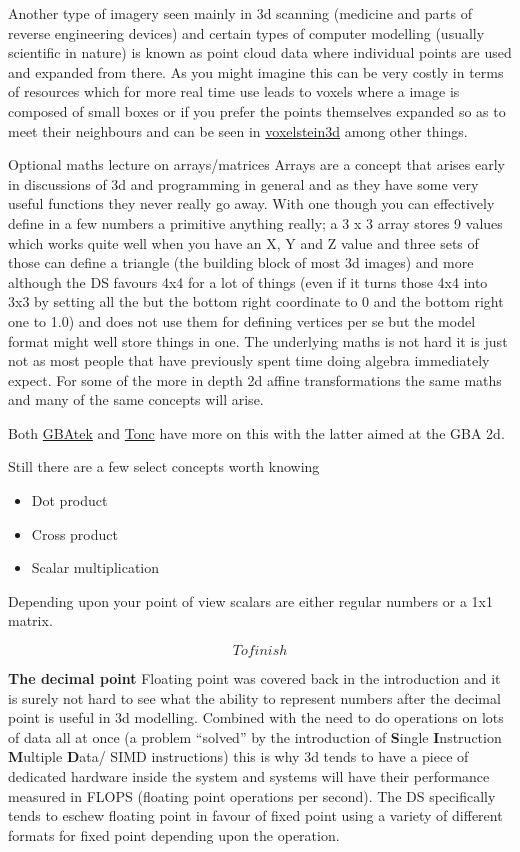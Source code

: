 \documentclass[
]{book}
\providecommand{\tightlist}{%
  \setlength{\itemsep}{0pt}\setlength{\parskip}{0pt}}
\begin{document}
Another type of imagery seen mainly in 3d scanning (medicine and parts of reverse engineering devices) and certain types of computer modelling (usually scientific in nature) is known as point cloud data where individual points are used and expanded from there. As you might imagine this can be very costly in terms of resources which for more real time use leads to voxels where a image is composed of small boxes or if you prefer the points themselves expanded so as to meet their neighbours and can be seen in \href{http://voxelstein3d.sourceforge.net/}{voxelstein3d} among other things.

Optional maths lecture on arrays/matrices Arrays are a concept that arises early in discussions of 3d and programming in general and as they have some very useful functions they never really go away. With one though you can effectively define in a few numbers a primitive anything really; a 3 x 3 array stores 9 values which works quite well when you have an X, Y and Z value and three sets of those can define a triangle (the building block of most 3d images) and more although the DS favours 4x4 for a lot of things (even if it turns those 4x4 into 3x3 by setting all the but the bottom right coordinate to 0 and the bottom right one to 1.0) and does not use them for defining vertices per se but the model format might well store things in one. The underlying maths is not hard it is just not as most people that have previously spent time doing algebra immediately expect. For some of the more in depth 2d affine transformations the same maths and many of the same concepts will arise.

Both \href{http://problemkaputt.de/gbatek.htm\#ds3dmatrixexamplesmathsbasics}{GBAtek} and \href{http://www.coranac.com/tonc/text/matrix.htm}{Tonc} have more on this with the latter aimed at the GBA 2d.

Still there are a few select concepts worth knowing

\begin{itemize}
\tightlist
\item
  Dot product
\item
  Cross product
\item
  Scalar multiplication
\end{itemize}

Depending upon your point of view scalars are either regular numbers or a 1x1 matrix.

\[To finish\]

\textbf{The decimal point} Floating point was covered back in the introduction and it is surely not hard to see what the ability to represent numbers after the decimal point is useful in 3d modelling. Combined with the need to do operations on lots of data all at once (a problem ``solved'' by the introduction of \textbf{S}ingle \textbf{I}nstruction \textbf{M}ultiple \textbf{D}ata/ SIMD instructions) this is why 3d tends to have a piece of dedicated hardware inside the system and systems will have their performance measured in FLOPS (floating point operations per second). The DS specifically tends to eschew floating point in favour of fixed point using a variety of different formats for fixed point depending upon the operation.
\end{document}
